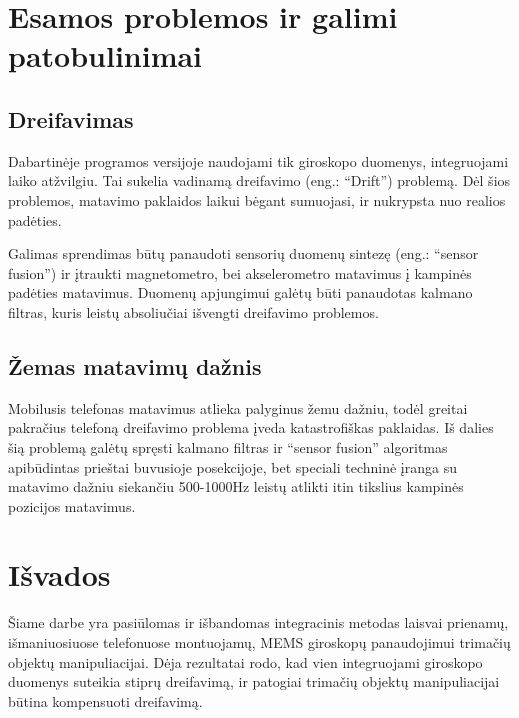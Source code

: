 \documentclass[12pt, a4paper, lithuanian, final]{article}
\begin{document}
\section{Esamos problemos ir galimi patobulinimai}

\subsection{Dreifavimas}
Dabartinėje programos versijoje naudojami tik giroskopo duomenys, integruojami laiko atžvilgiu.
Tai sukelia vadinamą dreifavimo (eng.: "`Drift"') problemą.
Dėl šios problemos, matavimo paklaidos laikui bėgant sumuojasi, ir nukrypsta nuo realios padėties.

Galimas sprendimas būtų panaudoti sensorių duomenų sintezę (eng.: "`sensor fusion"') ir įtraukti magnetometro, bei akselerometro matavimus į kampinės padėties matavimus.
Duomenų apjungimui galėtų būti panaudotas kalmano filtras, kuris leistų absoliučiai išvengti dreifavimo problemos.

\subsection{Žemas matavimų dažnis}
Mobilusis telefonas matavimus atlieka palyginus žemu dažniu, todėl greitai pakračius telefoną dreifavimo problema įveda katastrofiškas paklaidas.
Iš dalies šią problemą galėtų spręsti kalmano filtras ir "`sensor fusion"' algoritmas apibūdintas prieštai buvusioje posekcijoje, bet speciali techninė įranga su matavimo dažniu siekančiu 500-1000Hz leistų atlikti itin tikslius kampinės pozicijos matavimus.

\section{Išvados}

Šiame darbe yra pasiūlomas ir išbandomas integracinis metodas laisvai prienamų, išmaniuosiuose telefonuose montuojamų, MEMS giroskopų panaudojimui trimačių objektų manipuliacijai.
Dėja rezultatai rodo, kad vien integruojami giroskopo duomenys suteikia stiprų dreifavimą, ir patogiai trimačių objektų manipuliacijai būtina kompensuoti dreifavimą.
\end{document}
